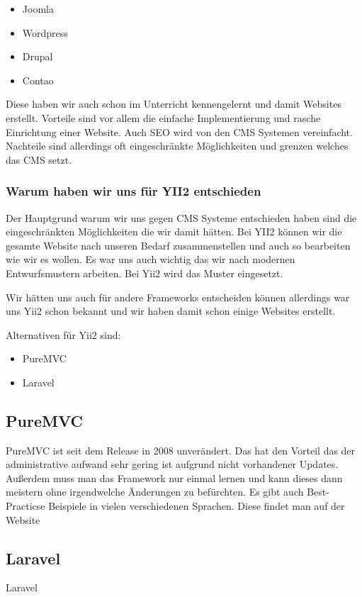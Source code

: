 \begin{itemize}
\item Joomla
\item Wordpress
\item Drupal
\item Contao
\end{itemize}

Diese haben wir auch schon im Unterricht kennengelernt und damit Websites erstellt. Vorteile sind vor allem die einfache Implementierung und rasche Einrichtung einer Website. Auch SEO wird von den CMS Systemen vereinfacht. Nachteile sind allerdings oft eingeschränkte Möglichkeiten und grenzen welches das CMS setzt.

\subsubsection{Warum haben wir uns für YII2 entschieden}

Der Hauptgrund warum wir uns gegen CMS Systeme entschieden haben sind die eingeschränkten Möglichkeiten die wir damit hätten. Bei YII2 können wir die gesamte Website nach unseren Bedarf zusammenstellen und auch so bearbeiten wie wir es wollen. Es war uns auch wichtig das wir nach modernen Entwurfsmustern arbeiten. Bei Yii2 wird das  Muster eingesetzt.

Wir hätten uns auch für andere Frameworks entscheiden können allerdings war uns Yii2 schon bekannt und wir haben damit schon einige Websites erstellt.

Alternativen für Yii2 sind:

\begin{itemize}
	\item PureMVC
	\item Laravel
\end{itemize}

\subsection{PureMVC}
PureMVC ist seit dem Release in 2008 unverändert. Das hat den Vorteil das der administrative aufwand sehr gering ist aufgrund nicht vorhandener Updates. Außerdem muss man das Framework nur einmal lernen und kann dieses dann meistern ohne irgendwelche Änderungen zu befürchten.
Es gibt auch Best-Practicse Beispiele in vielen verschiedenen Sprachen. Diese findet man auf der Website \cite{Pure_MVC}

\subsection{Laravel}
Laravel


